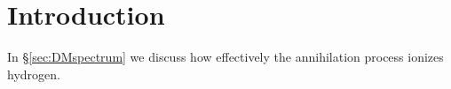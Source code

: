 \section{Introduction}

In \S\ref{sec:DMspectrum} we discuss how effectively the annihilation process ionizes hydrogen.

